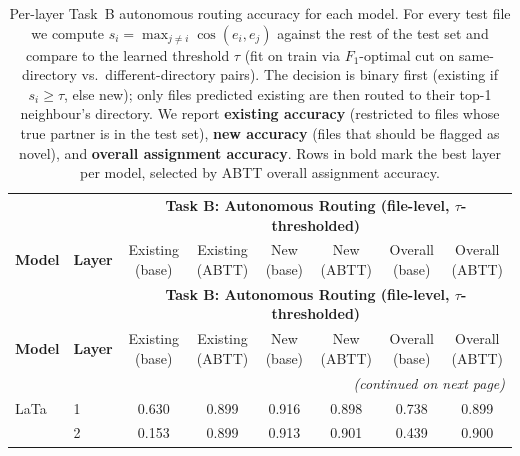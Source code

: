 \begingroup
\small
\setlength{\tabcolsep}{4pt}
\begin{longtable}{llcccccc}
\caption{Per-layer Task~B autonomous routing accuracy for each model. For every test file we compute $s_i = \max_{j \neq i} \cos(e_i, e_j)$ against the rest of the test set and compare to the learned threshold $\tau$ (fit on train via $F_1$-optimal cut on same-directory vs.\ different-directory pairs). The decision is binary first (existing if $s_i \geq \tau$, else new); only files predicted existing are then routed to their top-1 neighbour's directory. We report \textbf{existing accuracy} (restricted to files whose true partner is in the test set), \textbf{new accuracy} (files that should be flagged as novel), and \textbf{overall assignment accuracy}. Rows in bold mark the best layer per model, selected by ABTT overall assignment accuracy.}
\label{tab:taskB_routing_per_layer} \\
\toprule
\multicolumn{2}{c}{} & \multicolumn{6}{c}{\textbf{Task B: Autonomous Routing (file-level, $\tau$-thresholded)}} \\
\cmidrule(lr){3-8}
\textbf{Model} & \textbf{Layer} & \makecell{Existing\\(base)} & \makecell{Existing\\(ABTT)} & \makecell{New\\(base)} & \makecell{New\\(ABTT)} & \makecell{Overall\\(base)} & \makecell{Overall\\(ABTT)} \\
\midrule
\endfirsthead
\toprule
\multicolumn{2}{c}{} & \multicolumn{6}{c}{\textbf{Task B: Autonomous Routing (file-level, $\tau$-thresholded)}} \\
\cmidrule(lr){3-8}
\textbf{Model} & \textbf{Layer} & \makecell{Existing\\(base)} & \makecell{Existing\\(ABTT)} & \makecell{New\\(base)} & \makecell{New\\(ABTT)} & \makecell{Overall\\(base)} & \makecell{Overall\\(ABTT)} \\
\midrule
\endhead
\midrule
\multicolumn{8}{r}{\textit{(continued on next page)}} \\
\endfoot
\bottomrule
\endlastfoot
LaTa & 1 & 0.630 & 0.899 & 0.916 & 0.898 & 0.738 & 0.899 \\
 & 2 & 0.153 & 0.899 & 0.913 & 0.901 & 0.439 & 0.900 \\

\end{longtable}
